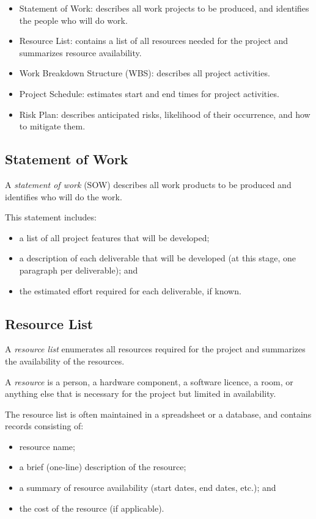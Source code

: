 \begin{itemize}
\item Statement of Work: describes all work projects to be produced,
  and identifies the people who will do work.
\item Resource List: contains a list of all resources needed for
the project and summarizes resource availability.
\item Work Breakdown Structure (WBS): describes all project activities.
\item Project Schedule: estimates start and end times for project activities.
\item Risk Plan: describes anticipated risks, likelihood of their occurrence,
and how to mitigate them.
\end{itemize}

\subsection*{Statement of Work}
A \emph{statement of work} (SOW) describes all work products to be
produced and identifies who will do the work.

This statement includes:
\begin{itemize}
\item a list of all project features that will be developed;
\item a description of each deliverable that will be developed (at
  this stage, one paragraph per deliverable); and
\item the estimated effort required for each deliverable, if known.
\end{itemize}

\subsection*{Resource List}

A \emph{resource list} enumerates all resources required for the
project and summarizes the availability of the resources.

A \emph{resource} is a person, a hardware component, a software
licence, a room, or anything else that is necessary for the project
but limited in availability.

The resource list is often maintained in a spreadsheet or a database,
and contains records consisting of:
\begin{itemize}
\item resource name;
\item a brief (one-line) description of the resource; 
\item a summary of resource availability (start dates, end dates, etc.); and
\item the cost of the resource (if applicable).
\end{itemize}

